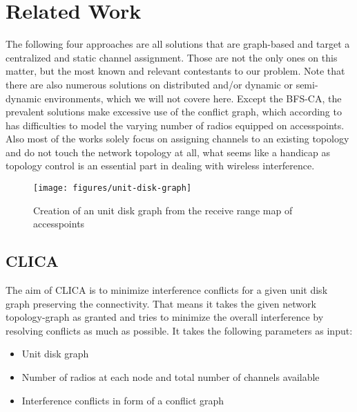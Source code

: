 \chapter{Related Work}
  The following four approaches are all solutions that are graph-based and target a centralized and static channel assignment.
  Those are not the only ones on this matter, but the most known and relevant contestants to our problem.
  Note that there are also numerous solutions on distributed and/or dynamic or semi-dynamic environments, which we will not covere here.
  Except the BFS-CA, the prevalent solutions make excessive use of the conflict graph, which according to \cite{overview_caa} has difficulties to model 
  the varying number of radios equipped on accesspoints. Also most of the works solely focus on assigning channels to an existing topology and do not touch 
  the network topology at all, what seems like a handicap as topology control is an essential part in dealing with wireless interference.
  
  \begin{figure}[h!]
    \centering
    \texttt{[image: figures/unit-disk-graph]}
    \caption{Creation of an unit disk graph from the receive range map of accesspoints}
    \label{fig:unit-disk-graph}
  \end{figure}
  
  \section{\ac{CLICA}}
    The aim of \ac{CLICA} \cite{CLICA} is to minimize interference conflicts for a given unit disk graph preserving the connectivity.
    That means it takes the given network topology-graph as granted and tries to minimize the overall interference by resolving conflicts as much as possible.
    It takes the following parameters as input:
    
    \begin{itemize}
      \item Unit disk graph
      
      \item Number of radios at each node and total number of channels available
      
      \item Interference conflicts in form of a conflict graph
    \end{itemize}
    
